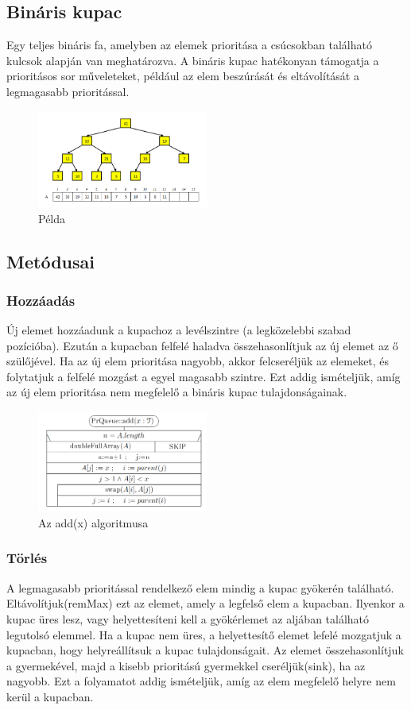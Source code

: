 \documentclass[margin=0px]{article}
\begin{document}
\subsection{Bináris kupac}
Egy teljes bináris fa, 
amelyben az elemek prioritása a csúcsokban található kulcsok alapján van meghatározva. 
A bináris kupac hatékonyan támogatja a prioritásos sor műveleteket,
például az elem beszúrását és eltávolítását a legmagasabb prioritással.
\begin{figure}[H]
    \centering
    \includegraphics[width=0.5\textwidth]{img/konkret_abrazolas.png}
    \caption{Példa}
\end{figure}

\subsection{Metódusai}
\subsubsection{Hozzáadás}
Új elemet hozzáadunk a kupachoz a levélszintre (a legközelebbi szabad pozícióba).
Ezután a kupacban felfelé haladva összehasonlítjuk az új elemet az ő szülőjével.
Ha az új elem prioritása nagyobb, akkor felcseréljük az elemeket, és folytatjuk a felfelé mozgást a egyel magasabb szintre.
Ezt addig ismételjük, amíg az új elem prioritása nem megfelelő a bináris kupac tulajdonságainak.
\begin{figure}[H]
    \centering
    \includegraphics[width=0.5\textwidth]{img/pr_add.png}
    \caption{Az add(x) algoritmusa}
\end{figure}

\subsubsection{Törlés}
A legmagasabb prioritással rendelkező elem mindig a kupac gyökerén található.
Eltávolítjuk(remMax) ezt az elemet, amely a legfelső elem a kupacban.
Ilyenkor a kupac üres lesz, vagy helyettesíteni kell a gyökérlemet az aljában található legutolsó elemmel.
Ha a kupac nem üres, a helyettesítő elemet lefelé mozgatjuk a kupacban, hogy helyreállítsuk a kupac tulajdonságait.
Az elemet összehasonlítjuk a gyermekével, majd a kisebb prioritású gyermekkel cseréljük(sink), ha az nagyobb.
Ezt a folyamatot addig ismételjük, amíg az elem megfelelő helyre nem kerül a kupacban.
\end{document}
